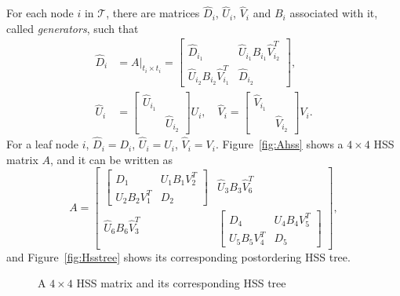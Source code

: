 \documentclass[times]{nlaauth}
\begin{document}
For each node $i$ in $\mathcal{T}$, there are matrices $\widehat{D}_i$, $\widehat{U}_i$, $\widehat{V}_i$ and $B_i$
associated with it, called \emph{generators}, such that
\begin{equation}
  \label{eq:new-hss}
  \begin{split}
  \widehat{D}_i & =A|_{t_i\times t_i}=
  \begin{bmatrix} \widehat{D}_{i_1} & \widehat{U}_{i_1}B_{i_1}\widehat{V}_{i_2}^T \\
    \widehat{U}_{i_2} B_{i_2} \widehat{V}_{i_1}^T & \widehat{D}_{i_2} \end{bmatrix}, \\
  \widehat{U}_i & =
  \begin{bmatrix}
    \widehat{U}_{i_1} & \\ & \widehat{U}_{i_2}
  \end{bmatrix}
  U_i, \quad
  \widehat{V}_i =
  \begin{bmatrix}
    \widehat{V}_{i_1} & \\ & \widehat{V}_{i_2}
  \end{bmatrix} V_i.
  \end{split}
\end{equation}
For a leaf node $i$, $\widehat{D}_i=D_i$, $\widehat{U}_i = U_i$,
$\widehat{V}_i=V_i$. Figure~\ref{fig:Ahss} shows a $4\times 4$ HSS matrix $A$, and
it can be written as
\begin{equation}
\label{eq:posthsslevel}
A=\begin{bmatrix} \begin{bmatrix} D_1 & {U}_1B_1{V}_2^T \\  {U}_2B_2{V}_1^T & D_2 \end{bmatrix}   & \widehat{U}_3B_3\widehat{V}_6^T \\
\widehat{U}_6B_6\widehat{V}_3^T &
\begin{bmatrix} D_4 & {U}_4B_4{V}_5^T \\  {U}_5B_5{V}_4^T & D_5 \end{bmatrix}  \end{bmatrix},
\end{equation}
and Figure~\ref{fig:Hsstree} shows its corresponding postordering HSS tree.

\begin{figure}
\centering
{}
\quad
{}
\caption{A $4\times 4$ HSS matrix and its corresponding HSS tree}
\label{fig:gnaHss}
\end{figure}
\end{document}
